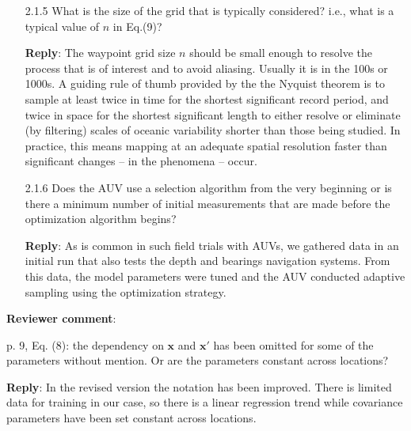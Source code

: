 \documentclass[a4paper]{article}
\newcommand{\bx}{ {\boldsymbol x} }
\def\revcom{\textbf{Reviewer comment}}
\def\reply{\textbf{Reply}}
\begin{document}
\begin{answers}
\begin{itemize}[noitemsep,topsep=0pt,parsep=0pt,partopsep=0pt]
\reply: The coverage available is usually limited by man-hours to follow operations, but for large-time operation also on battery capacity. The important question here is "How do one prioritize the correct points to visit?", which is central to the development of the EIBV and the application shown in the paper. 
\vspace{1em}

\item[2.1.5] What is the size of the grid that is typically considered? i.e., what is a typical value of $n$ in Eq.(9)?\par 

\reply: The waypoint grid size $n$ should be small enough to resolve the process that is of interest and to avoid aliasing. Usually it is in the 100s or 1000s. A guiding rule of thumb provided by the the Nyquist theorem is to sample at least twice in time for the shortest significant record period, and twice in space for the shortest significant length to either resolve or eliminate (by filtering) scales of oceanic variability shorter than those being studied. In practice, this means mapping at an adequate spatial resolution faster than significant changes – in the phenomena – occur. 
\vspace{1em}

\item[2.1.6] Does the AUV use a selection algorithm from the very beginning or is there a minimum number of initial measurements that are made before the optimization algorithm begins?\par

\reply: As is common in such field trials with AUVs, we gathered data in an initial run that also tests the depth and bearings navigation systems. From this data, the model parameters were tuned and the AUV conducted adaptive sampling using the optimization strategy.
\vspace{1em}

\end{itemize}

\item{\revcom :}\label{r2c2}

p. 9, Eq. (8): the dependency on $\bx$ and $\bx'$ has been omitted for some of the parameters without mention. Or are the parameters constant across locations?

\reply: In the revised version the notation has been improved. There is limited data for training in our case, so there is a linear regression trend while covariance parameters have been set constant across locations.


\end{answers}
\end{document}

